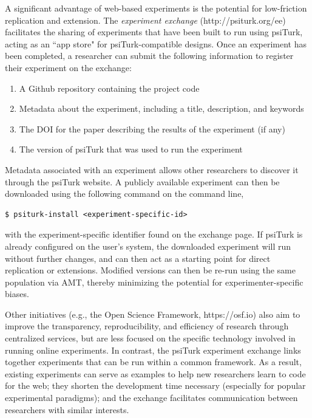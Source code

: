 \documentclass[twocolumn]{svjour3}          %
\begin{document}
A significant advantage of web-based experiments is the potential for low-friction replication and extension. 
The \emph{experiment exchange} (http://psiturk.org/ee) facilitates the sharing of experiments that have been built to run using psiTurk, acting as an ``app store" for psiTurk-compatible designs.
Once an experiment has been completed, a researcher can submit the following information to register their experiment on the exchange:

\begin{enumerate}
\item A Github repository containing the project code
\item Metadata about the experiment, including a title, description, and keywords
\item The DOI for the paper describing the results of the experiment (if any)
\item The version of psiTurk that was used to run the experiment
\end{enumerate}


Metadata associated with an experiment allows other researchers to discover it through the psiTurk website.
A publicly available experiment can then be downloaded using the following command on the command line,

\begin{lstlisting}
$ psiturk-install <experiment-specific-id>
\end{lstlisting}

\noindent with the experiment-specific identifier found on the exchange page.
If psiTurk is already configured on the user's system, the downloaded experiment will run without further changes, and can then act as a starting point for direct replication or extensions.
Modified versions can then be re-run using the same population via AMT, thereby minimizing the potential for experimenter-specific biases.

Other initiatives (e.g., the Open Science Framework, https://osf.io) also aim to improve the transparency, reproducibility, and efficiency of research through centralized services, but are less focused on the specific technology involved in running online experiments.
In contrast, the psiTurk experiment exchange links together experiments that can be run within a common framework.
As a result, existing experiments can serve as examples to help new researchers learn to code for the web; they shorten the development time necessary (especially for popular experimental paradigms); and the exchange facilitates communication between researchers with similar interests.
\end{document}
